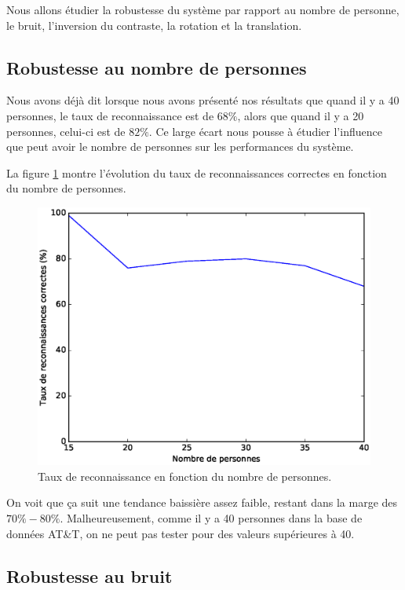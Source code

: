 Nous allons étudier la robustesse du système par rapport au nombre de personne,
le bruit, l'inversion du contraste, la rotation et la translation.


\subsection{Robustesse au nombre de personnes}
Nous avons déjà dit lorsque nous avons présenté nos résultats que quand il y a
40 personnes, le taux de reconnaissance est de $68\%$, alors que quand
il y a 20 personnes, celui-ci est de $82\%$. Ce large écart nous pousse à étudier
l'influence que peut avoir le nombre de personnes sur les performances du système.

La figure \ref{fig:robustness:nombre_de_personnes} montre l'évolution du taux
de reconnaissances correctes en fonction du nombre de personnes.

\begin{figure}[H]
    \centering
    \includegraphics[scale=0.5]{images/robustesse_nombre_de_personnes}
    \caption{Taux de reconnaissance en fonction du nombre de personnes.}
    \label{fig:robustness:nombre_de_personnes}
\end{figure}
On voit que ça suit une tendance baissière assez faible, restant dans la 
marge des $70\%-80\%$.
Malheureusement, comme il y a 40 personnes dans la base de données AT\&T, on ne 
peut pas tester pour des valeurs supérieures à 40.


\subsection{Robustesse au bruit}
